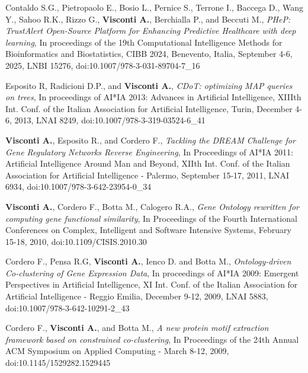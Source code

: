 \begin{itemize}
		
		
		 Contaldo S.G.\cofirst, Pietropaolo E.\cofirst, Bosio L., Pernice S., Terrone I., Baccega D., Wang Y., Sahoo R.K., Rizzo G., \textbf{Visconti A.}\corresponding, Berchialla P.\colast, and Beccuti M.\colast, \emph{PHeP: TrustAlert Open-Source Platform for Enhancing Predictive Healthcare with deep learning}, In proceedings of the 19th Computational Intelligence Methods for Bioinformatics and Biostatistics, CIBB 2024, Benevento, Italia, September 4-6, 2025, LNBI 15276, doi:10.1007/978-3-031-89704-7\_16 %
		
		 Esposito R, Radicioni D.P., and \textbf{Visconti A.}, \emph{CDoT: optimizing MAP queries on trees}, In proceedings of AI*IA 2013: Advances in Artificial Intelligence, XIIIth Int. Conf. of the Italian Association for Artificial Intelligence, Turin, December 4-6, 2013, LNAI 8249, doi:10.1007/978-3-319-03524-6\_41 %

		  \textbf{Visconti A.}, Esposito R., and Cordero F., \emph{Tackling the DREAM Challenge for Gene Regulatory Networks Reverse Engineering}, In Proceedings of AI*IA 2011: Artificial Intelligence Around Man and Beyond, XIIth Int. Conf. of the Italian Association for Artificial Intelligence - Palermo, September 15-17, 2011, LNAI 6934, doi:10.1007/978-3-642-23954-0\_34 %

		 \textbf{Visconti A.}, Cordero F., Botta M., Calogero R.A., \emph{Gene Ontology rewritten for computing gene functional similarity}, In Proceedings of the Fourth International Conferences on Complex, Intelligent and Software Intensive Systems, February 15-18, 2010, doi:10.1109/CISIS.2010.30 %


		 Cordero F., Pensa R.G, \textbf{Visconti A.}, Ienco D. and  Botta M., \emph{Ontology-driven Co-clustering of Gene Expression Data}, In proceedings of AI*IA 2009: Emergent Perspectives in Artificial Intelligence, XI Int. Conf. of the Italian Association for Artificial Intelligence - Reggio Emilia, December 9-12, 2009, LNAI 5883, doi:10.1007/978-3-642-10291-2\_43 %

		 Cordero F., \textbf{Visconti A.}, and Botta M., \emph{A new protein motif extraction framework based on constrained co-clustering}, In Proceedings of the 24th Annual ACM Symposium on Applied Computing - March 8-12, 2009, doi:10.1145/1529282.1529445 %

	\end{itemize}


